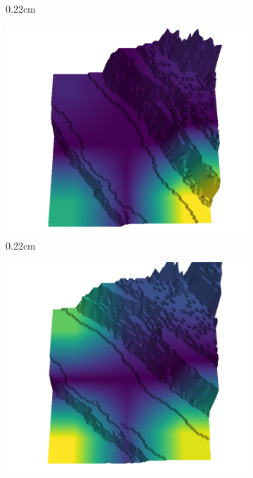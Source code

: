 \documentclass[../document.tex]{subfiles}
\begin{document}
\begin{figure}[H]
\begin{subfigure}[b]{0.242\linewidth}
            \caption{0.22cm}
            \end{subfigure}
            \begin{subfigure}[b]{0.242\linewidth}
            \includegraphics[width=\linewidth]{../img/5/quarry/false_positive/26-patch-3d-majavi-colormap-40.png}
            \caption{0.22cm}
            \end{subfigure}
            \begin{subfigure}[b]{0.242\linewidth}
            \includegraphics[width=\linewidth]{../img/5/quarry/false_positive/27-patch-3d-majavi-colormap-45.png}

\end{subfigure}
\end{figure}
\end{document}
